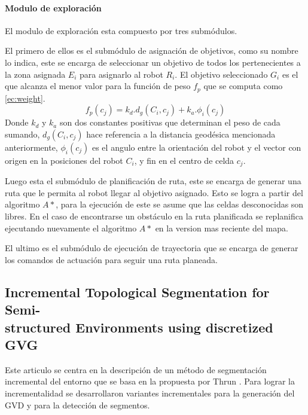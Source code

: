 \paragraph{Modulo de exploración}\label{par:estar:moduloexp}
El modulo de exploración esta compuesto por tres submódulos. 

El primero de ellos es el submódulo de asignación de objetivos, como su nombre lo indica, este se encarga de seleccionar un objetivo de todos los pertenecientes a la zona asignada $E_i$ para asignarlo al robot $R_i$. El objetivo seleccionado $G_i$ es el que alcanza el menor valor para la función de peso $f_p$ que se computa como \ref{ec:weight}.
\begin{equation}\label{ec:weight}
  f_p(c_j) = k_d.d_g(C_i,c_j) + k_a.\phi_i(c_j)
\end{equation}
Donde $k_d$ y $k_a$ son dos constantes positivas que determinan el peso de cada sumando, $d_g(C_i,c_j)$ hace referencia a la distancia geodésica mencionada anteriormente, $\phi_i(c_j)$ es el angulo entre la orientación del robot y el vector con origen en la posiciones del robot $C_i$, y fin en el centro de celda $c_j$. 

Luego esta el submódulo de planificación de ruta, este se encarga de generar una ruta que le permita al robot llegar al objetivo asignado. Esto se logra a partir del algoritmo $A*$, para la ejecución de este se asume que las celdas desconocidas son libres. En el caso de encontrarse un obstáculo en la ruta planificada se replanifica ejecutando nuevamente el algoritmo $A*$ en la version mas reciente del mapa.

El ultimo es el submódulo de ejecución de trayectoria que se encarga de generar los comandos de actuación para seguir una ruta planeada.

\subsection[Incremental Topological Segmentation for Semi-structured Environments using discretized GVG]{Incremental Topological Segmentation for Semi-\\structured Environments using discretized GVG}

Este articulo se centra en la descripción de un método de segmentación incremental del entorno que se basa en la propuesta por Thrun \cite{Thrun1998}. Para lograr la incrementalidad se desarrollaron variantes incrementales para la generación del GVD y para la detección de segmentos.

